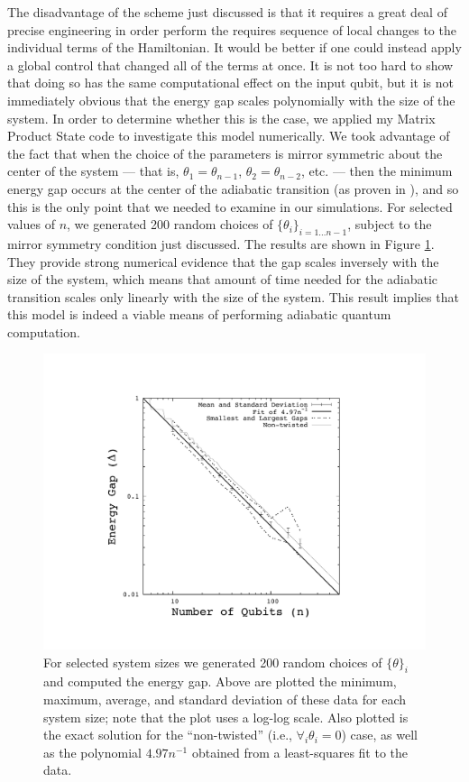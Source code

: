 \documentclass[12pt]{amsbook}
\theoremstyle{plain}
\theoremstyle{definition}
\theoremstyle{remark}
\begin{document}
The disadvantage of the scheme just discussed is that it requires a great deal of precise engineering in order perform the requires sequence of local changes to the individual terms of the Hamiltonian.  It would be better if one could instead apply a global control that changed all of the terms at once.  It is not too hard to show that doing so has the same computational effect on the input qubit\cite{TheFuture}, but it is not immediately obvious that the energy gap scales polynomially with the size of the system.  In order to determine whether this is the case, we applied my Matrix Product State code to investigate this model numerically.  We took advantage of the fact that when the choice of the parameters is mirror symmetric about the center of the system --- that is, $\theta_1 = \theta_{n-1}$, $\theta_2=\theta_{n-2}$, etc. --- then the minimum energy gap occurs at the center of the adiabatic transition (as proven in \cite{TheFuture}), and so this is the only point that we needed to examine in our simulations.  For selected values of $n$, we generated 200 random choices of $\{\theta_i\}_{i=1\dots n-1}$, subject to the mirror symmetry condition just discussed.  The results are shown in Figure \ref{plot:qtrans}.  They provide strong numerical evidence that the gap scales inversely with the size of the system, which means that amount of time needed for the adiabatic transition scales only linearly with the size of the system.  This result implies that this model is indeed a viable means of performing adiabatic quantum computation.

\begin{figure}
\includegraphics[width=\columnwidth]{images/qtrans}
\caption{
\label{plot:qtrans}
For selected system sizes we generated 200 random choices of $\{\theta\}_i$ and computed the energy gap.  Above are plotted the minimum, maximum, average, and standard deviation of these data for each system size;  note that the plot uses a log-log scale.  Also plotted is the exact solution for the ``non-twisted'' (i.e., $\forall_i\theta_i=0$) case, as well as the polynomial $4.97n^{-1}$ obtained from a least-squares fit to the data.}
\end{figure}
\end{document}

